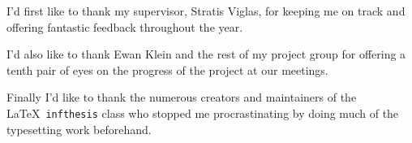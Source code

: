 \begin{acknowledgements}

	I'd first like to thank my supervisor, Stratis Viglas, for keeping me on track and offering fantastic feedback throughout the year.

	I'd also like to thank Ewan Klein and the rest of my project group for offering a tenth pair of eyes on the progress of the project at our meetings. 

	Finally I'd like to thank the numerous creators and maintainers of the \LaTeX\ \texttt{infthesis} class who stopped me procrastinating by doing much of the typesetting work beforehand.

\end{acknowledgements}